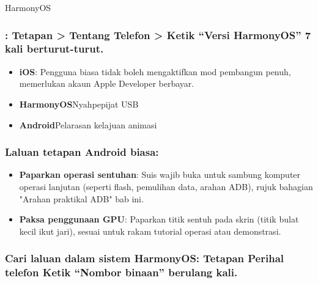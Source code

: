 


HarmonyOS

\subsubsection*{: Tetapan > Tentang Telefon > Ketik “Versi HarmonyOS” 7 kali berturut-turut.}

\begin{itemize}
  \item \textbf{iOS}: Pengguna biasa tidak boleh mengaktifkan mod pembangun penuh, memerlukan akaun Apple Developer berbayar.
  \item \textbf{HarmonyOS}Nyahpepijat USB
  \item \textbf{Android}Pelarasan kelajuan animasi
\end{itemize}

\subsubsection*{Laluan tetapan Android biasa:}

\begin{itemize}
  \item \textbf{Paparkan operasi sentuhan}: Suis wajib buka untuk sambung komputer operasi lanjutan (seperti flash, pemulihan data, arahan ADB), rujuk bahagian "Arahan praktikal ADB" bab ini.
  \item \textbf{Paksa penggunaan GPU}: Paparkan titik sentuh pada skrin (titik bulat kecil ikut jari), sesuai untuk rakam tutorial operasi atau demonstrasi.
\end{itemize}

\subsubsection*{Cari laluan dalam sistem HarmonyOS: Tetapan Perihal telefon Ketik “Nombor binaan” berulang kali.}

